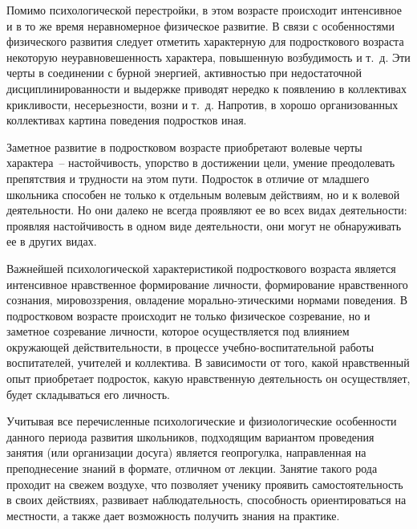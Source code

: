 Помимо психологической перестройки, в этом возрасте происходит интенсивное и в
то же время неравномерное физическое развитие. В связи с особенностями
физического развития следует отметить характерную для подросткового возраста
некоторую неуравновешенность характера, повышенную возбудимость и т.~д. Эти
черты в соединении с бурной энергией, активностью при недостаточной
дисциплинированности и выдержке приводят нередко к появлению в коллективах
крикливости, несерьезности, возни и т.~д. Напротив, в хорошо организованных
коллективах картина поведения подростков иная.

Заметное развитие в подростковом возрасте приобретают волевые черты характера~--
настойчивость, упорство в достижении цели, умение преодолевать препятствия и
трудности на этом пути. Подросток в отличие от младшего школьника способен не
только к отдельным волевым действиям, но и к волевой деятельности. Но они далеко
не всегда проявляют ее во всех видах деятельности: проявляя настойчивость в
одном виде деятельности, они могут не обнаруживать ее в других видах.

Важнейшей психологической характеристикой подросткового возраста является
интенсивное нравственное формирование личности, формирование нравственного
сознания, мировоззрения, овладение морально-этическими нормами поведения. В
подростковом возрасте происходит не только физическое созревание, но и заметное
созревание личности, которое осуществляется под влиянием окружающей
действительности, в процессе учебно-воспитательной работы воспитателей, учителей
и коллектива. В зависимости от того, какой нравственный опыт приобретает
подросток, какую нравственную деятельность он осуществляет, будет складываться
его личность.

Учитывая все перечисленные психологические и физиологические особенности данного
периода развития школьников, подходящим вариантом проведения занятия (или
организации досуга) является геопрогулка, направленная на преподнесение знаний в
формате, отличном от лекции. Занятие такого рода проходит на свежем воздухе, что
позволяет ученику проявить самостоятельность в своих действиях, развивает
наблюдательность, способность ориентироваться на местности, а также дает
возможность получить знания на практике.

